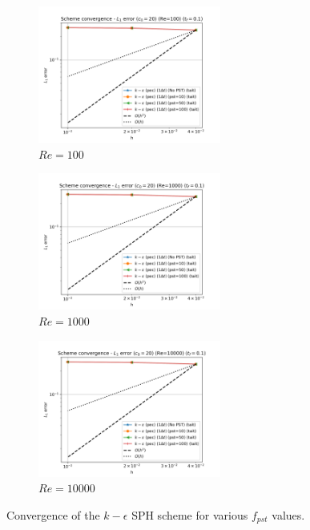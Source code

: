 \begin{figure}[htbp!]
  \begin{subfigure}{7cm}
    \centering\includegraphics[width=6cm]{Code-Figures/keps/pst/dt_pois_conv_c0_20_re_100.png}
    \caption{$Re = 100$}
  \end{subfigure}
  \begin{subfigure}{7cm}
    \centering\includegraphics[width=6cm]{Code-Figures/keps/pst/dt_pois_conv_c0_20_re_1000.png}
    \caption{$Re = 1000$}
  \end{subfigure}
  \begin{subfigure}{7cm}
    \centering\includegraphics[width=6cm]{Code-Figures/keps/pst/dt_pois_conv_c0_20_re_10000.png}
    \caption{$Re = 10000$}
  \end{subfigure}
  \caption{Convergence of the $k-\epsilon$ SPH scheme for various $f_{pst}$ values.}
  \label{fig:keps-pst}
\end{figure}

